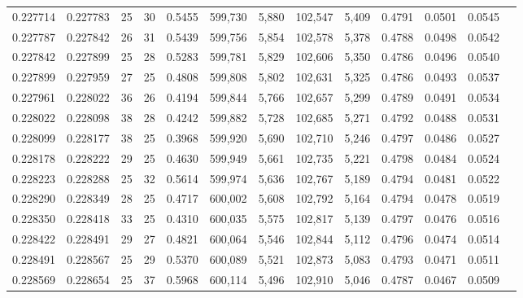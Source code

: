 \begin{tabular}{rrrrrrrrrrrrr}
0.227714 & 0.227783 &  25 &  30 &                                     0.5455 & 599,730 &   5,880 & 102,547 &   5,409 & 0.4791 & 0.0501 & 0.0545 \\
0.227787 & 0.227842 &  26 &  31 &                                     0.5439 & 599,756 &   5,854 & 102,578 &   5,378 & 0.4788 & 0.0498 & 0.0542 \\
0.227842 & 0.227899 &  25 &  28 &                                     0.5283 & 599,781 &   5,829 & 102,606 &   5,350 & 0.4786 & 0.0496 & 0.0540 \\
0.227899 & 0.227959 &  27 &  25 &                                     0.4808 & 599,808 &   5,802 & 102,631 &   5,325 & 0.4786 & 0.0493 & 0.0537 \\
0.227961 & 0.228022 &  36 &  26 &                                     0.4194 & 599,844 &   5,766 & 102,657 &   5,299 & 0.4789 & 0.0491 & 0.0534 \\
0.228022 & 0.228098 &  38 &  28 &                                     0.4242 & 599,882 &   5,728 & 102,685 &   5,271 & 0.4792 & 0.0488 & 0.0531 \\
0.228099 & 0.228177 &  38 &  25 &                                     0.3968 & 599,920 &   5,690 & 102,710 &   5,246 & 0.4797 & 0.0486 & 0.0527 \\
0.228178 & 0.228222 &  29 &  25 &                                     0.4630 & 599,949 &   5,661 & 102,735 &   5,221 & 0.4798 & 0.0484 & 0.0524 \\
0.228223 & 0.228288 &  25 &  32 &                                     0.5614 & 599,974 &   5,636 & 102,767 &   5,189 & 0.4794 & 0.0481 & 0.0522 \\
0.228290 & 0.228349 &  28 &  25 &                                     0.4717 & 600,002 &   5,608 & 102,792 &   5,164 & 0.4794 & 0.0478 & 0.0519 \\
0.228350 & 0.228418 &  33 &  25 &                                     0.4310 & 600,035 &   5,575 & 102,817 &   5,139 & 0.4797 & 0.0476 & 0.0516 \\
0.228422 & 0.228491 &  29 &  27 &                                     0.4821 & 600,064 &   5,546 & 102,844 &   5,112 & 0.4796 & 0.0474 & 0.0514 \\
0.228491 & 0.228567 &  25 &  29 &                                     0.5370 & 600,089 &   5,521 & 102,873 &   5,083 & 0.4793 & 0.0471 & 0.0511 \\
0.228569 & 0.228654 &  25 &  37 &                                     0.5968 & 600,114 &   5,496 & 102,910 &   5,046 & 0.4787 & 0.0467 & 0.0509 \\

\end{tabular}
